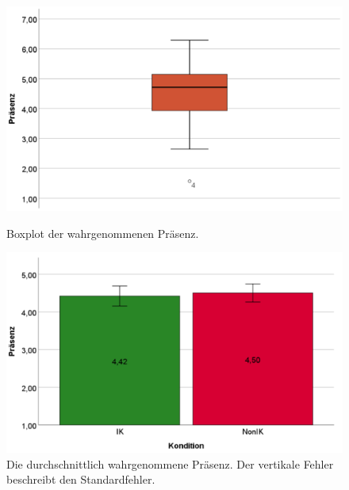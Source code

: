 \documentclass[a4paper,11pt]{article}%
\renewcommand{\\}{\vspace*{0.5\baselineskip} \newline}
\begin{document}
{\begin{figure}[H]
   \begin{minipage}[t]{.5\linewidth} %
      \includegraphics[width=\linewidth]{Abbildungen/AuswertungDiagramme/Final/BP_Presence.png}
      \caption[Boxplot der wahrgenommenen Präsenz]{Boxplot der wahrgenommenen Präsenz.}
      \label{SD_PresenceBP}
   \end{minipage}
   \hspace{.02\linewidth}%
   \begin{minipage}[t]{.5\linewidth} %
     \includegraphics[width=\linewidth]{Abbildungen/AuswertungDiagramme/Final/SD_Presence_Mittelwerte.png}
      \caption[Durchschnittlich wahrgenommene Präsenz der Konditionen]{Die durchschnittlich wahrgenommene Präsenz. Der vertikale Fehler beschreibt den Standardfehler.}
       \label{SD_Presence_Mittel}
   \end{minipage}
\end{figure}

}
\end{document}
